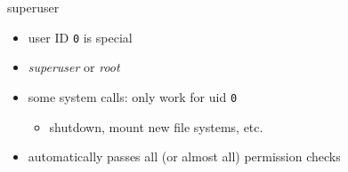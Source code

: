\begin{frame}{superuser}
\begin{itemize}
\item user ID \texttt{0} is special
\item \textit{superuser} or \textit{root}
\vspace{.5cm}
\item some system calls: only work for uid \texttt{0}
    \begin{itemize}
    \item shutdown, mount new file systems, etc.
    \end{itemize}
\item automatically passes all (or almost all) permission checks
\end{itemize}
\end{frame}
